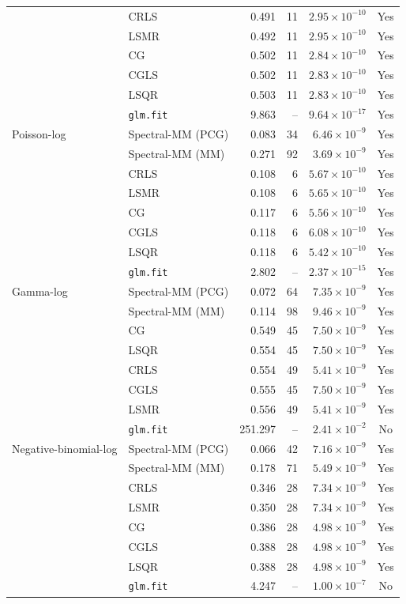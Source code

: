 \begin{longtable}{llrrrc}
 & CRLS & 0.491 & 11 & $2.95\times10^{-10}$ & Yes \\
 & LSMR & 0.492 & 11 & $2.95\times10^{-10}$ & Yes \\
 & CG & 0.502 & 11 & $2.84\times10^{-10}$ & Yes \\
 & CGLS & 0.502 & 11 & $2.83\times10^{-10}$ & Yes \\
 & LSQR & 0.503 & 11 & $2.83\times10^{-10}$ & Yes \\
 & \texttt{glm.fit} & 9.863 & -- & $9.64\times10^{-17}$ & Yes \\
\midrule
Poisson-log & Spectral-MM (PCG) & 0.083 & 34 & $6.46\times10^{-9}$ & Yes \\
 & Spectral-MM (MM) & 0.271 & 92 & $3.69\times10^{-9}$ & Yes \\
 & CRLS & 0.108 & 6 & $5.67\times10^{-10}$ & Yes \\
 & LSMR & 0.108 & 6 & $5.65\times10^{-10}$ & Yes \\
 & CG & 0.117 & 6 & $5.56\times10^{-10}$ & Yes \\
 & CGLS & 0.118 & 6 & $6.08\times10^{-10}$ & Yes \\
 & LSQR & 0.118 & 6 & $5.42\times10^{-10}$ & Yes \\
 & \texttt{glm.fit} & 2.802 & -- & $2.37\times10^{-15}$ & Yes \\
\midrule
Gamma-log & Spectral-MM (PCG) & 0.072 & 64 & $7.35\times10^{-9}$ & Yes \\
 & Spectral-MM (MM) & 0.114 & 98 & $9.46\times10^{-9}$ & Yes \\
 & CG & 0.549 & 45 & $7.50\times10^{-9}$ & Yes \\
 & LSQR & 0.554 & 45 & $7.50\times10^{-9}$ & Yes \\
 & CRLS & 0.554 & 49 & $5.41\times10^{-9}$ & Yes \\
 & CGLS & 0.555 & 45 & $7.50\times10^{-9}$ & Yes \\
 & LSMR & 0.556 & 49 & $5.41\times10^{-9}$ & Yes \\
 & \texttt{glm.fit} & 251.297 & -- & $2.41\times10^{-2}$ & No \\
\midrule
Negative-binomial-log & Spectral-MM (PCG) & 0.066 & 42 & $7.16\times10^{-9}$ & Yes \\
 & Spectral-MM (MM) & 0.178 & 71 & $5.49\times10^{-9}$ & Yes \\
 & CRLS & 0.346 & 28 & $7.34\times10^{-9}$ & Yes \\
 & LSMR & 0.350 & 28 & $7.34\times10^{-9}$ & Yes \\
 & CG & 0.386 & 28 & $4.98\times10^{-9}$ & Yes \\
 & CGLS & 0.388 & 28 & $4.98\times10^{-9}$ & Yes \\
 & LSQR & 0.388 & 28 & $4.98\times10^{-9}$ & Yes \\
 & \texttt{glm.fit} & 4.247 & -- & $1.00\times10^{-7}$ & No \\
\end{longtable}

